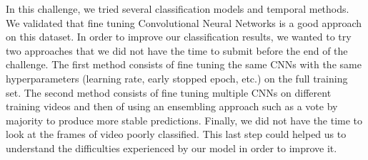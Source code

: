 \documentclass[10pt,twocolumn,letterpaper]{article}
\begin{document}
In this challenge, we tried several classification models and temporal methods. We validated that fine tuning Convolutional Neural Networks is a good approach on this dataset. In order to improve our classification results, we wanted to try two approaches that we did not have the time to submit before the end of the challenge. The first method consists of fine tuning the same CNNs with the same hyperparameters (learning rate, early stopped epoch, etc.) on the full training set. The second method consists of fine tuning multiple CNNs on different training videos and then of using an ensembling approach such as a vote by majority to produce more stable predictions. Finally, we did not have the time to look at the frames of video poorly classified. This last step could helped us to understand the difficulties experienced by our model in order to improve it.







{\small


}
\end{document}
